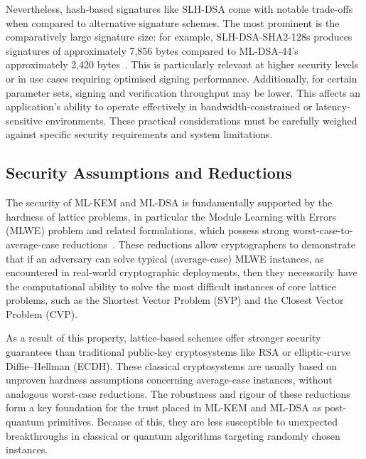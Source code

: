 \documentclass[12pt,a4paper]{article}
\begin{document}
Nevertheless, hash-based signatures like SLH-DSA come with notable trade-offs when compared to alternative signature schemes. The most prominent is the comparatively large signature size: for example, SLH-DSA-SHA2-128s produces signatures of approximately 7,856 bytes compared to ML-DSA-44's approximately 2,420 bytes~\cite{nist-fips-205-2024,nist-fips-204-2024}. This is particularly relevant at higher security levels or in use cases requiring optimised signing performance. Additionally, for certain parameter sets, signing and verification throughput may be lower. This affects an application's ability to operate effectively in bandwidth-constrained or latency-sensitive environments. These practical considerations must be carefully weighed against specific security requirements and system limitations.

\subsection{Security Assumptions and Reductions}

The security of ML-KEM and ML-DSA is fundamentally supported by the hardness of lattice problems, in particular the Module Learning with Errors (MLWE) problem and related formulations, which possess strong worst-case-to-average-case reductions~\cite{nist-fips-203-2024,nist-fips-204-2024}. These reductions allow cryptographers to demonstrate that if an adversary can solve typical (average-case) MLWE instances, as encountered in real-world cryptographic deployments, then they necessarily have the computational ability to solve the most difficult instances of core lattice problems, such as the Shortest Vector Problem (SVP) and the Closest Vector Problem (CVP).

As a result of this property, lattice-based schemes offer stronger security guarantees than traditional public-key cryptosystems like RSA or elliptic-curve Diffie–Hellman (ECDH). These classical cryptosystems are usually based on unproven hardness assumptions concerning average-case instances, without analogous worst-case reductions. The robustness and rigour of these reductions form a key foundation for the trust placed in ML-KEM and ML-DSA as post-quantum primitives. Because of this, they are less susceptible to unexpected breakthroughs in classical or quantum algorithms targeting randomly chosen instances.

\end{document}
